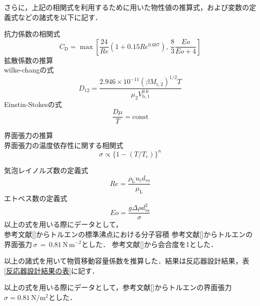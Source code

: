 \documentclass[a4j]{jsreport}
\begin{document}
さらに，上記の相関式を利用するために用いた物性値の推算式，および変数の定義式などの諸式を以下に記す．

抗力係数の相関式
\begin{equation}
    C_\mathrm{D} = \max \left[ \frac{24}{Re}(1+0.15Re^{0.687}), \, \frac{8}{3} \frac{Eo}{Eo+4} \right]
\end{equation}
拡散係数の推算\\
wilke-changの式
\begin{equation}
    D_{12} = \frac{2.946\times 10^{-11}(\beta M_{\mathrm{r,2}})^{1/2} T} {\mu_2 V_{\mathrm{b},1}^{0.6}}
\end{equation}
Einstin-Stokesの式
\begin{equation}
    \frac{D \mu}{T} = \text{const}
\end{equation}

界面張力の推算\\
界面張力の温度依存性に関する相関式
\begin{equation}
    \sigma \propto \{ 1-(T/T_\mathrm{c}) \}^n
\end{equation}

気泡レイノルズ数の定義式
\begin{equation}
    Re = \frac{\rho_\mathrm{L}u_\mathrm{t} d_\mathrm{vs}}{\mu_\mathrm{L}}
\end{equation}
エトベス数の定義式
\begin{equation}
    Eo = \frac{g \varDelta \rho d_\mathrm{vs}^2}{\sigma}
\end{equation}
以上の式を用いる際にデータとして，\\
参考文献[]からトルエンの標準沸点における分子容積
参考文献[]からトルエンの界面張力\,$\sigma\,=\,0.81\,\mathrm{ N\,m^{-2}}$とした．
参考文献[]から会合度を1とした．
\par
以上の諸式を用いて物質移動容量係数を推算した．結果は反応器設計結果，表\ref{反応器設計結果の表}に記す．

以上の式を用いる際にデータとして，参考文献[]からトルエンの界面張力$\sigma=0.81 \,\si{\newton \per \square \metre}$とした．
\end{document}
